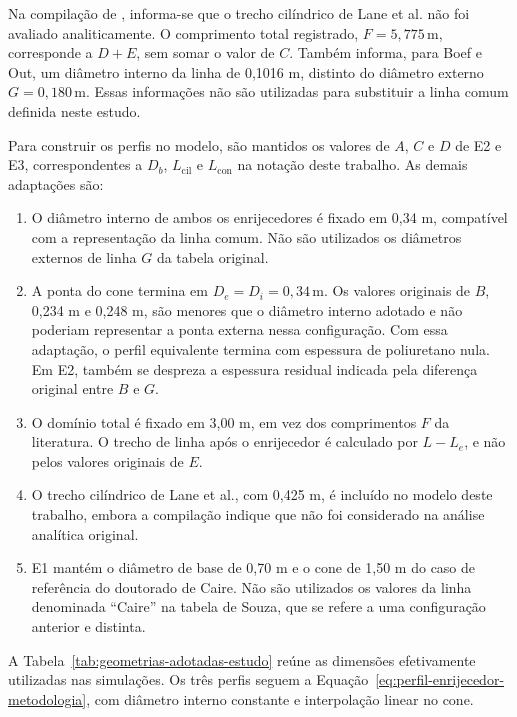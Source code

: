 \documentclass[arial,centeredequations,english,brazilian,oneside,section=TITLE]{ifes8}
\begin{document}
Na compilação de , informa-se que o trecho cilíndrico de Lane et al.
não foi avaliado analiticamente. O comprimento total registrado,
$F=5{,}775\,\mathrm{m}$, corresponde a $D+E$, sem somar o valor de $C$.
Também informa, para Boef e Out, um diâmetro interno da linha de 0,1016 m,
distinto do diâmetro externo $G=0{,}180\,\mathrm{m}$. Essas informações
não são utilizadas para substituir a linha comum definida neste estudo.

Para construir os perfis no modelo, são mantidos os valores de $A$, $C$
e $D$ de E2 e E3, correspondentes a $D_b$, $L_{\mathrm{cil}}$ e
$L_{\mathrm{con}}$ na notação deste trabalho. As demais adaptações são:
\begin{enumerate}
  \item O diâmetro interno de ambos os enrijecedores é fixado em 0,34 m,
  compatível com a representação da linha comum. Não são utilizados os
  diâmetros externos de linha $G$ da tabela original.
  \item A ponta do cone termina em $D_e=D_i=0{,}34\,\mathrm{m}$.
  Os valores originais de $B$, 0,234 m e 0,248 m, são menores que o
  diâmetro interno adotado e não poderiam representar a ponta externa
  nessa configuração. Com essa adaptação, o perfil equivalente termina
  com espessura de poliuretano nula. Em E2, também se despreza a
  espessura residual indicada pela diferença original entre $B$ e $G$.
  \item O domínio total é fixado em 3,00 m, em vez dos comprimentos $F$
  da literatura. O trecho de linha após o enrijecedor é calculado por
  $L-L_e$, e não pelos valores originais de $E$.
  \item O trecho cilíndrico de Lane et al., com 0,425 m, é incluído no
  modelo deste trabalho, embora a compilação indique que não foi
  considerado na análise analítica original.
  \item E1 mantém o diâmetro de base de 0,70 m e o cone de 1,50 m do
  caso de referência do doutorado de Caire. Não são utilizados os valores
  da linha denominada ``Caire'' na tabela de Souza, que se refere a uma
  configuração anterior e distinta.
\end{enumerate}

A Tabela~\ref{tab:geometrias-adotadas-estudo} reúne as dimensões efetivamente
utilizadas nas simulações. Os três perfis seguem a
Equação~\eqref{eq:perfil-enrijecedor-metodologia}, com diâmetro interno
constante e interpolação linear no cone.
\end{document}
